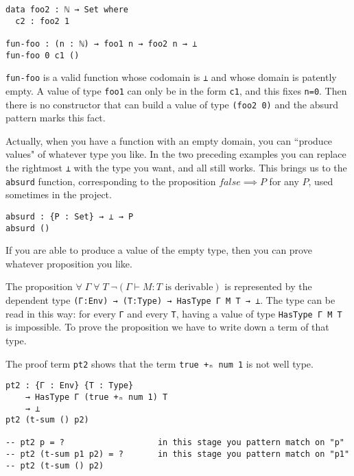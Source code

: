 \documentclass{article}
\begin{document}
\begin{tcolorbox}[breakable, enhanced, parbox=false]
\begin{verbatim}
data foo2 : ℕ → Set where
  c2 : foo2 1

fun-foo : (n : ℕ) → foo1 n → foo2 n → ⊥
fun-foo 0 c1 ()
\end{verbatim}

\texttt{fun-foo} is a valid function whose codomain is \texttt{⊥} and whose domain is patently empty.
A value of type \texttt{foo1} can only be in the form \texttt{c1}, and this fixes \texttt{n=0}.
Then there is no constructor that can build a value of type \texttt{(foo2 0)} and the absurd pattern marks this fact.

Actually, when you have a function with an empty domain, you can ``produce values" of whatever type you like.
In the two preceding examples you can replace the rightmost \texttt{⊥} with the type you want, and all still works.
This brings us to the \texttt{absurd} function, corresponding to the proposition $false \implies P$ for any $P$, used sometimes in the project.

\begin{verbatim}
absurd : {P : Set} → ⊥ → P
absurd ()
\end{verbatim}

If you are able to produce a value of the empty type, then you can prove whatever proposition you like.

\end{tcolorbox}


The proposition $\forall \; \Gamma \; \forall \; T \; \neg (\Gamma \vdash M : T \text{ is derivable})$ is represented by the dependent type \texttt{(Γ:Env) → (T:Type) → HasType Γ M T → ⊥}.
The type can be read in this way: for every \texttt{Γ} and every \texttt{T}, having a value of type \texttt{HasType Γ M T} is impossible.
To prove the proposition we have to write down a term of that type.

The proof term \texttt{pt2} shows that the term \texttt{true +ₙ num 1} is not well type.

\begin{verbatim}
pt2 : {Γ : Env} {T : Type}
    → HasType Γ (true +ₙ num 1) T
    → ⊥
pt2 (t-sum () p2)

-- pt2 p = ?                   in this stage you pattern match on "p"
-- pt2 (t-sum p1 p2) = ?       in this stage you pattern match on "p1"
-- pt2 (t-sum () p2)
\end{verbatim}
\end{document}

